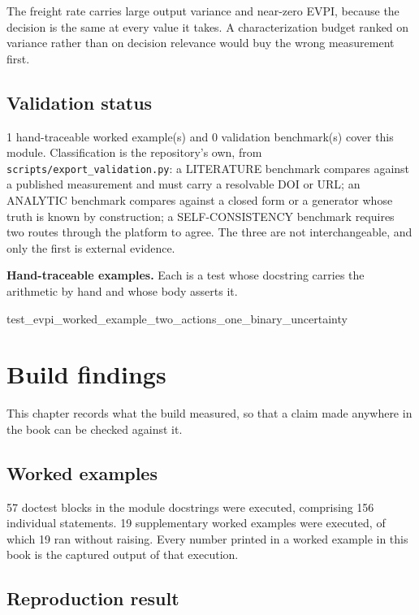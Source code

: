 \documentclass[10pt,a4paper,twoside]{report}
\begin{document}
The freight rate carries large output variance and near-zero EVPI, because the decision is the same at every value it takes. A characterization budget ranked on variance rather than on decision relevance would buy the wrong measurement first.

\section{Validation status}

1 hand-traceable worked example(s) and 0 validation benchmark(s) cover this module. Classification is the repository's own, from \texttt{scripts/export\_validation.py}: a LITERATURE benchmark compares against a published measurement and must carry a resolvable DOI or URL; an ANALYTIC benchmark compares against a closed form or a generator whose truth is known by construction; a SELF-CONSISTENCY benchmark requires two routes through the platform to agree. The three are not interchangeable, and only the first is external evidence.

\textbf{Hand-traceable examples.} Each is a test whose docstring carries the arithmetic by hand and whose body asserts it.

\begin{verbatimsmall}
test_evpi_worked_example_two_actions_one_binary_uncertainty
\end{verbatimsmall}

\clearpage

\appendix

\chapter{Build findings}\label{ch:findings}

This chapter records what the build measured, so that a claim made anywhere in the book can be checked against it.

\section{Worked examples}

57 doctest blocks in the module docstrings were executed, comprising 156 individual statements. 19 supplementary worked examples were executed, of which 19 ran without raising. Every number printed in a worked example in this book is the captured output of that execution.

\section{Reproduction result}
\end{document}

